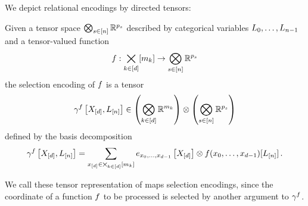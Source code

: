 We depict relational encodings by directed tensors:
\begin{center}
	
\end{center}








\begin{definition}\label{def:selectionEncoding}
	Given a tensor space $\bigotimes_{s\in[n]}\mathbb{R}^{p_{s}}$ described by categorical variables $L_{0},\ldots,L_{n-1}$ and a tensor-valued function
		\[ f : \bigtimes_{k\in[d]}[m_{k}] \rightarrow \bigotimes_{s\in[n]}\mathbb{R}^{p_{s}} \]
	the selection encoding of $f$ is a tensor
		\[ \gamma^{f}\left[X_{[d]},L_{[n]}\right] \in \left(\bigotimes_{k\in[d]} \mathbb{R}^{m_{k}}\right) \otimes \left(\bigotimes_{s\in[n]}\mathbb{R}^{p_{s}}\right) \]
	defined by the basis decomposition
		\[ \gamma^{f}\left[X_{[d]},L_{[n]}\right] = \sum_{x_{[d]}\in\bigtimes_{k\in[d]}[m_{k}]} e_{x_{0},\ldots,x_{d-1}}\left[X_{[d]}\right] \otimes f(x_{0},\ldots,x_{d-1})[L_{[n]}] \, .  \]
\end{definition}

We call these tensor representation of maps selection encodings, since the coordinate of a function $f$ to be processed is selected by another argument to $\gamma^{f}$.

